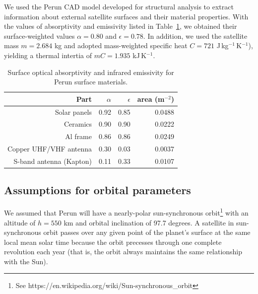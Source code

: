 \documentclass[]{aastex62}
\begin{document}
We used the Perun CAD model developed for structural analysis to extract information about
external satellite surfaces and their material properties.
With the values of absorptivity and emissivity listed in Table~\ref{tab:inputsAbsEmiss}, we obtained
their surface-weighted values $\alpha=0.80$ and $\epsilon=0.78$. In addition, we used the satellite 
mass $m=2.684$ kg and adopted mass-weighted specific heat $C=721$  J\,kg$^{-1}$\,K$^{-1}$), yielding 
a thermal intertia of $mC = 1.935$ kJ\,K$^{-1}$. 

\begin{table}[t]
	\centering
	\caption{Surface optical absorptivity and infrared emissivity for Perun surface materials. }
	\label{tab:inputsAbsEmiss}
	\begin{tabular}{r|r|r|r} %
		\hline
  	              Part                          &       $\alpha$  &   $\epsilon$    &   area (m$^{-2}$)   \\
	  	\hline
         Solar panels                          &          0.92      &          0.85      &   0.0488  \\  
            Ceramics                            &         0.90       &         0.90      &   0.0222  \\ 
              Al frame                           &        0.86        &         0.86      &    0.0249  \\  
  Copper UHF/VHF antenna            &        0.30        &          0.03     &   0.0037  \\
         S-band antenna (Kapton)       &        0.11       &         0.33       &   0.0107   \\ 
		\hline     
	\end{tabular} 
\end{table}
 

\subsection{Assumptions for orbital parameters}

We assumed that Perun will have a nearly-polar sun-synchronous 
orbit\footnote{See https://en.wikipedia.org/wiki/Sun-synchronous\_orbit} 
with an altitude of $h=550$ km and orbital inclination of 97.7 degrees. A satellite in sun-synchronous 
orbit passes over any given point of the planet's surface at the same local mean solar time because the 
orbit precesses through one complete revolution each year (that is, the orbit always maintains the same 
relationship with the Sun). 
\end{document}
